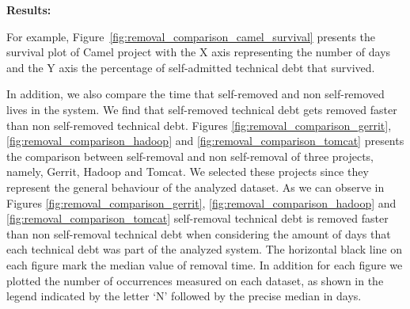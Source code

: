 
\noindent \textbf{Results:} 


For example, Figure~\ref{fig:removal_comparison_camel_survival} presents the survival plot of Camel project with the X axis representing the number of days  and the Y axis the percentage of self-admitted technical debt that survived.


In addition, we also compare the time that self-removed and non self-removed \SATD lives in the system. We find that self-removed technical debt gets removed faster than non self-removed technical debt. Figures \ref{fig:removal_comparison_gerrit}, \ref{fig:removal_comparison_hadoop} and \ref{fig:removal_comparison_tomcat} presents the comparison between self-removal and non self-removal of three projects, namely, Gerrit, Hadoop and Tomcat. We selected these projects since they represent the general behaviour of the analyzed dataset. As we can observe in Figures \ref{fig:removal_comparison_gerrit}, \ref{fig:removal_comparison_hadoop} and \ref{fig:removal_comparison_tomcat} self-removal technical debt is removed faster than non self-removal technical debt when considering the amount of days that each technical debt was part of the analyzed system. The horizontal black line on each figure mark the median value of removal time. In addition for each figure we plotted the number of occurrences measured on each dataset, as shown in the legend indicated by the letter `N' followed by the precise median in days.







